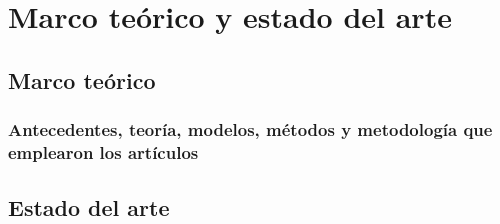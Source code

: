 \chapter{Marco teórico y estado del arte}
\section{Marco teórico}
\subsection{Antecedentes, teoría, modelos, métodos y metodología que emplearon los artículos}

\section{Estado del arte}